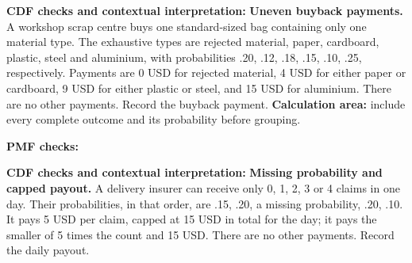 \textbf{CDF checks and contextual interpretation:}
\vfill
\clearpage
{}
\textbf{Uneven buyback payments.} A workshop scrap centre buys one standard-sized bag containing only one material type. The exhaustive types are rejected material, paper, cardboard, plastic, steel and aluminium, with probabilities .20, .12, .18, .15, .10, .25, respectively. Payments are 0 USD for rejected material, 4 USD for either paper or cardboard, 9 USD for either plastic or steel, and 15 USD for aluminium. There are no other payments. Record the buyback payment.
\textbf{Calculation area:} include every complete outcome and its probability before grouping.
\par\noindent\begin{minipage}[t]{.37\linewidth}\vspace{0pt}\centering
{}\end{minipage}\hfill\begin{minipage}[t]{.60\linewidth}\vspace{0pt}\centering
{}
\end{minipage}\par
\textbf{PMF checks:} \hrulefill\par
{}
\par\noindent\begin{minipage}[t]{.37\linewidth}\vspace{0pt}\centering
{}\end{minipage}\hfill\begin{minipage}[t]{.60\linewidth}\vspace{0pt}\centering
{}
\end{minipage}\par
\textbf{CDF checks and contextual interpretation:}
\vfill
\clearpage
{}
\textbf{Missing probability and capped payout.} A delivery insurer can receive only 0, 1, 2, 3 or 4 claims in one day. Their probabilities, in that order, are .15, .20, a missing probability, .20, .10. It pays 5 USD per claim, capped at 15 USD in total for the day; it pays the smaller of 5 times the count and 15 USD. There are no other payments. Record the daily payout.
